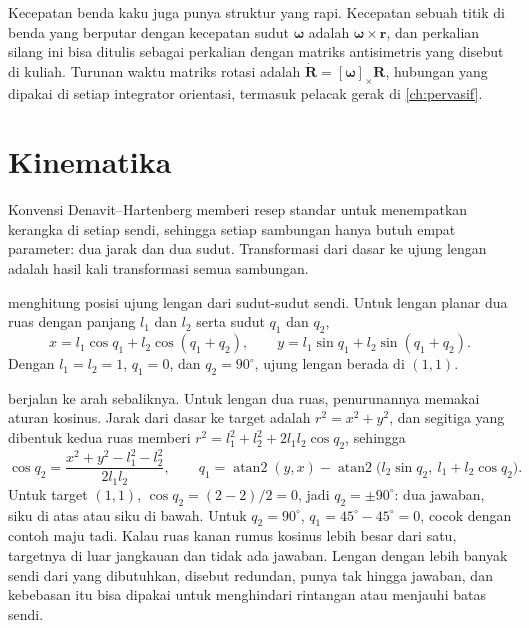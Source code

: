 Kecepatan benda kaku juga punya struktur yang rapi. Kecepatan sebuah titik di benda yang berputar dengan kecepatan
sudut $\bm\omega$ adalah $\bm\omega\times\bm r$, dan perkalian silang ini bisa ditulis sebagai perkalian dengan matriks
antisimetris yang disebut  di kuliah. Turunan waktu matriks rotasi adalah
$\dot{\bm R}=[\bm\omega]_\times\bm R$, hubungan yang dipakai di setiap integrator orientasi, termasuk pelacak gerak di
\cref{ch:pervasif}.

\section{Kinematika}

Konvensi Denavit--Hartenberg \citep{denavit1955} memberi resep standar untuk menempatkan kerangka di setiap sendi,
sehingga setiap sambungan hanya butuh empat parameter: dua jarak dan dua sudut. Transformasi dari dasar ke ujung
lengan adalah hasil kali transformasi semua sambungan.

 menghitung posisi ujung lengan dari sudut-sudut sendi. Untuk lengan planar dua ruas
dengan panjang $l_1$ dan $l_2$ serta sudut $q_1$ dan $q_2$,
\begin{equation}
x=l_1\cos q_1+l_2\cos(q_1+q_2),\qquad y=l_1\sin q_1+l_2\sin(q_1+q_2).
\end{equation}
Dengan $l_1=l_2=1$, $q_1=0$, dan $q_2=90^\circ$, ujung lengan berada di $(1,1)$.

 berjalan ke arah sebaliknya. Untuk lengan dua ruas, penurunannya memakai aturan kosinus.
Jarak dari dasar ke target adalah $r^2=x^2+y^2$, dan segitiga yang dibentuk kedua ruas memberi
$r^2=l_1^2+l_2^2+2l_1l_2\cos q_2$, sehingga
\begin{equation}
\cos q_2=\frac{x^2+y^2-l_1^2-l_2^2}{2l_1l_2},\qquad
q_1=\operatorname{atan2}(y,x)-\operatorname{atan2}\big(l_2\sin q_2,\ l_1+l_2\cos q_2\big).
\end{equation}
Untuk target $(1,1)$, $\cos q_2=(2-2)/2=0$, jadi $q_2=\pm90^\circ$: dua jawaban, siku di atas atau siku di bawah.
Untuk $q_2=90^\circ$, $q_1=45^\circ-45^\circ=0$, cocok dengan contoh maju tadi. Kalau ruas kanan rumus kosinus
lebih besar dari satu, targetnya di luar jangkauan dan tidak ada jawaban. Lengan dengan lebih banyak sendi dari yang
dibutuhkan, disebut redundan, punya tak hingga jawaban, dan kebebasan itu bisa dipakai untuk menghindari rintangan
atau menjauhi batas sendi.


